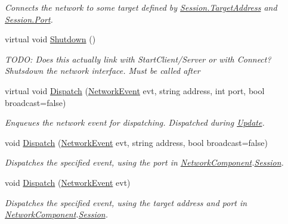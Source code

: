 \begin{DoxyCompactItemize}
\begin{DoxyCompactList}\small\item\em Connects the network to some target defined by \hyperlink{class_skyrates_1_1_common_1_1_network_1_1_session_a6d550a6d31777ca6d1d6dfba00c7955b}{Session.\-Target\-Address} and \hyperlink{class_skyrates_1_1_common_1_1_network_1_1_session_aed90ad75336095fa3287c961aba40c7b}{Session.\-Port}. \end{DoxyCompactList}\item 
virtual void \hyperlink{class_skyrates_1_1_common_1_1_network_1_1_network_common_a328d553ece81ace5ce3fbe07ec86d62a}{Shutdown} ()
\begin{DoxyCompactList}\small\item\em T\-O\-D\-O\-: Does this actually link with Start\-Client/\-Server or with Connect? Shutsdown the network interface. Must be called after \end{DoxyCompactList}\item 
virtual void \hyperlink{class_skyrates_1_1_common_1_1_network_1_1_network_common_aa8f66da72ba3eb8486641af3c7e9cdb8}{Dispatch} (\hyperlink{class_skyrates_1_1_common_1_1_network_1_1_event_1_1_network_event}{Network\-Event} evt, string address, int port, bool broadcast=false)
\begin{DoxyCompactList}\small\item\em Enqueues the network event for dispatching. Dispatched during \hyperlink{class_skyrates_1_1_common_1_1_network_1_1_network_common_aeeaf913a5fe9ee8cb966271ee864bc08}{Update}. \end{DoxyCompactList}\item 
void \hyperlink{class_skyrates_1_1_common_1_1_network_1_1_network_common_a77ae933f9b8b7440ea53ad4757a206ad}{Dispatch} (\hyperlink{class_skyrates_1_1_common_1_1_network_1_1_event_1_1_network_event}{Network\-Event} evt, string address, bool broadcast=false)
\begin{DoxyCompactList}\small\item\em Dispatches the specified event, using the port in \hyperlink{class_skyrates_1_1_common_1_1_network_1_1_network_component}{Network\-Component}.\hyperlink{class_skyrates_1_1_common_1_1_network_1_1_session}{Session}. \end{DoxyCompactList}\item 
void \hyperlink{class_skyrates_1_1_common_1_1_network_1_1_network_common_a20fe9428460150ce71c5c55ae4639b7d}{Dispatch} (\hyperlink{class_skyrates_1_1_common_1_1_network_1_1_event_1_1_network_event}{Network\-Event} evt)
\begin{DoxyCompactList}\small\item\em Dispatches the specified event, using the target address and port in \hyperlink{class_skyrates_1_1_common_1_1_network_1_1_network_component}{Network\-Component}.\hyperlink{class_skyrates_1_1_common_1_1_network_1_1_session}{Session}. \end{DoxyCompactList}\item 

\end{DoxyCompactItemize}
